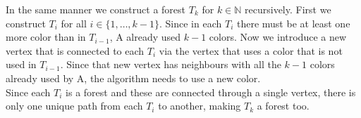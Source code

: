 \documentclass[a4paper,12pt]{scrartcl}
\newcommand{\N}{\ensuremath{\mathbb{N}}}
\begin{document}
In the same manner we construct a forest $T_k$ for $k\in \N$ recursively. First we construct $T_i$ for all $i \in \{1,\dots, k-1\}$. Since in each $T_i$ there must be at least one more color than in $T_{i-1}$, A already used $k-1$ colors. Now we introduce a new vertex that is connected to each $T_i$ via the vertex that uses a color that is not used in $T_{i-1}$. Since that new vertex has neighbours with all the $k-1$ colors already used by A, the algorithm needs to use a new color. \\

Since each $T_i$ is a forest and these are connected through a single vertex, there is only one unique path from each $T_i$ to another, making $T_k$ a forest too.
\end{document}
